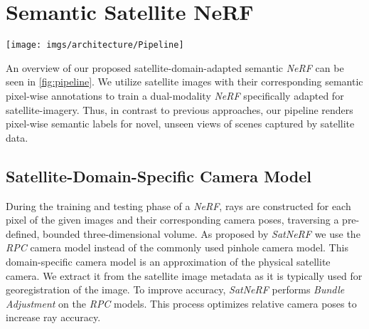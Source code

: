 
\section{Semantic Satellite NeRF}

\begin{figure*}[t!]
	\centering
	\texttt{[image: imgs/architecture/Pipeline]}
	\caption{Overview of our proposed model. The satellite-domain-adapted outputs  (\ie elements in the blue area)  are combined using an irradiance lighting model to produce the color rendering as originally proposed by \emph{SatNeRF} \cite{satnerf}. Using an additional semantic head (\ie elements in the red area) our proposed method is able to produce a corresponding semantic pixel-wise labeling. We combine this with the learned lighting scalar to create a three-dimensional semantic visualization. We introduce a transient regularization loss $L_t$ to reduce artifacts in the learned appearance based on the semantic input data. }
	\label{fig:pipeline}
\end{figure*}

An overview of our proposed satellite-domain-adapted semantic \emph{NeRF} can be seen in \cref{fig:pipeline}.
We utilize satellite images with their corresponding semantic pixel-wise annotations to train a dual-modality \emph{NeRF} specifically adapted for satellite-imagery. 
Thus, in contrast to previous approaches, our pipeline renders pixel-wise semantic labels for novel, unseen views of scenes captured by satellite data.


\subsection{Satellite-Domain-Specific Camera Model}
\label{subsec:irradiance_lighting:model}



During the training and testing phase of a \emph{NeRF}, rays are constructed for each pixel of the given images and their corresponding camera poses, traversing a pre-defined, bounded three-dimensional volume. 
As proposed by \emph{SatNeRF} \cite{satnerf} we use the \emph{RPC} \cite{rpc} camera model instead of the commonly used pinhole \cite{pinhole} camera model.
This domain-specific camera model is an approximation of the physical satellite camera. 
We extract it from the satellite image metadata as it is typically used for georegistration of the image. 
To improve accuracy, \emph{SatNeRF} \cite{satnerf} performs \emph{Bundle Adjustment} on the \emph{RPC} models. This process optimizes relative camera poses to increase ray accuracy. 




